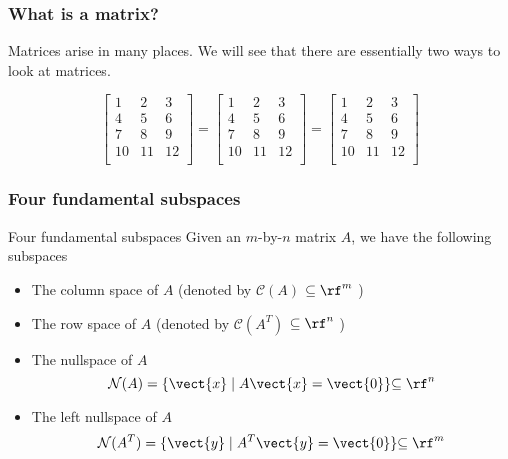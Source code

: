 

\begin{frame}
  \frametitle{What is a matrix?}

  Matrices arise in many places.  We will see that there are
  essentially two ways to look at matrices.
  
  \[
  \left[
    \begin{array}{c|c|c}
      1 & 2 & 3 \\
      4 & 5 & 6 \\
      7 & 8 & 9 \\
      10 & 11 & 12 \\
    \end{array}
    \right]
  =
  \left[
    \begin{array}{ccc}
      1 & 2 & 3 \\
      4 & 5 & 6 \\
      7 & 8 & 9 \\
      10 & 11 & 12 \\
    \end{array}
    \right]
  =
  \left[
    \begin{array}{ccc}
      1 & 2 & 3 \\
      \hline
      4 & 5 & 6 \\
      \hline
      7 & 8 & 9 \\
      \hline
      10 & 11 & 12 \\
    \end{array}
    \right]
  \]
\end{frame}

\begin{frame}
  \frametitle{Four fundamental subspaces}

  \begin{block}{Four fundamental subspaces}
    Given an $m$-by-$n$ matrix $A$, we have the following subspaces
    \begin{itemize}
    \item The column space of $A$ (denoted by ${\mathcal C}(A)$
      {$\subseteq \rf^m$}
      )
    \item The row space of $A$ (denoted by ${\mathcal C}(A^T)$
      {$\subseteq \rf^n$}
      )
    \item The nullspace of $A$
      \[
        {\mathcal N}(A) = \{\vect{x} \;|\; A\vect{x}=\vect{0}\}
        {\subseteq \rf^n}
      \]
    \item The left nullspace of $A$
      \[
        {\mathcal N}(A^T) = \{\vect{y} \;|\; A^T\vect{y}=\vect{0}\}
        {\subseteq \rf^m}
      \]
    \end{itemize}
  \end{block}
\end{frame}

